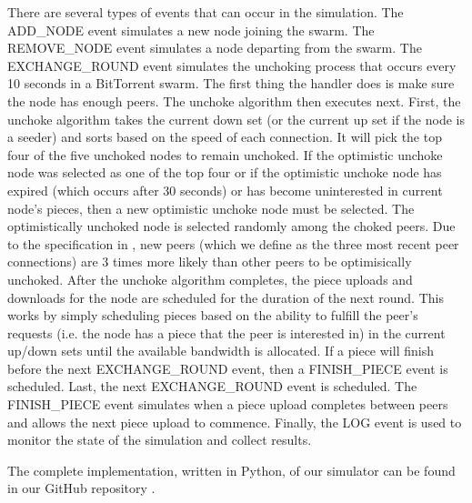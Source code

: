 There are several types of events that can occur in the simulation. The ADD\_NODE event simulates a new
node joining the swarm.  The REMOVE\_NODE event simulates a node departing
from the swarm. The EXCHANGE\_ROUND event simulates the unchoking process
that occurs every 10 seconds in a BitTorrent swarm. The first thing the
handler does is make sure the node has enough peers. The unchoke algorithm
then executes next. First, the unchoke algorithm takes the current down
set (or the current up set if the node is a seeder) and sorts based on
the speed of each connection.  It will pick the top four of the 
five unchoked nodes to remain unchoked. If the optimistic unchoke node
was selected as one of the top four or if the optimistic unchoke node
has expired (which occurs after 30 seconds) or has become uninterested
in current node's pieces, then a new optimistic unchoke node must be
selected. The optimistically unchoked node is selected randomly among
the choked peers. Due to the specification in \cite{bep003}, new peers
(which we define as the three most recent peer connections) are 3 times
more likely than other peers to be optimisically unchoked.  After the
unchoke algorithm completes, the piece uploads and downloads for the node
are scheduled for the duration of the next round. This works by simply
scheduling pieces based on the ability to fulfill the peer's requests
(i.e. the node has a piece that the peer is interested in) in the current
up/down sets until the available bandwidth is allocated. If a piece
will finish before the next EXCHANGE\_ROUND event, then a FINISH\_PIECE
event is scheduled. Last, the next EXCHANGE\_ROUND event is scheduled.
The FINISH\_PIECE event simulates when a piece upload completes between
peers and allows the next piece upload to commence. Finally, the LOG event is
used to monitor the state of the simulation and collect results.

The complete implementation, written in Python, of our simulator can be found in our GitHub repository \cite{github}.
